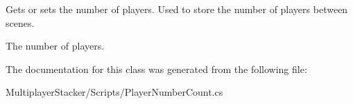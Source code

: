 Gets or sets the number of players. Used to store the number of players between scenes. 

The number of players.

The documentation for this class was generated from the following file\+:\begin{DoxyCompactItemize}
\item 
Multiplayer\+Stacker/\+Scripts/Player\+Number\+Count.\+cs\end{DoxyCompactItemize}
